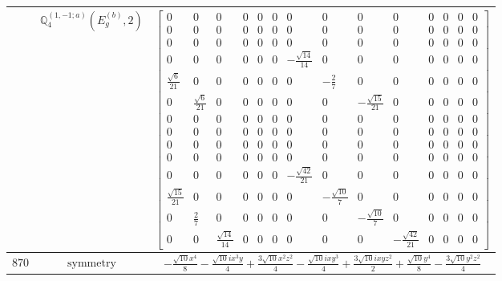 \documentclass[fleqn,8pt,landscape]{jsarticle}
\begin{document}
\begin{longtable}{ccc}
$  $ & $ \mathbb{Q}_{4}^{(1,-1;a)}(E_{g}^{(b)},2) $ & $ \begin{bmatrix} 0 & 0 & 0 & 0 & 0 & 0 & 0 & 0 & 0 & 0 & 0 & 0 & 0 & 0 \\ 0 & 0 & 0 & 0 & 0 & 0 & 0 & 0 & 0 & 0 & 0 & 0 & 0 & 0 \\ 0 & 0 & 0 & 0 & 0 & 0 & 0 & 0 & 0 & 0 & 0 & 0 & 0 & 0 \\ 0 & 0 & 0 & 0 & 0 & 0 & - \frac{\sqrt{14}}{14} & 0 & 0 & 0 & 0 & 0 & 0 & 0 \\ \frac{\sqrt{6}}{21} & 0 & 0 & 0 & 0 & 0 & 0 & - \frac{2}{7} & 0 & 0 & 0 & 0 & 0 & 0 \\ 0 & \frac{\sqrt{6}}{21} & 0 & 0 & 0 & 0 & 0 & 0 & - \frac{\sqrt{15}}{21} & 0 & 0 & 0 & 0 & 0 \\ 0 & 0 & 0 & 0 & 0 & 0 & 0 & 0 & 0 & 0 & 0 & 0 & 0 & 0 \\ 0 & 0 & 0 & 0 & 0 & 0 & 0 & 0 & 0 & 0 & 0 & 0 & 0 & 0 \\ 0 & 0 & 0 & 0 & 0 & 0 & 0 & 0 & 0 & 0 & 0 & 0 & 0 & 0 \\ 0 & 0 & 0 & 0 & 0 & 0 & 0 & 0 & 0 & 0 & 0 & 0 & 0 & 0 \\ 0 & 0 & 0 & 0 & 0 & 0 & - \frac{\sqrt{42}}{21} & 0 & 0 & 0 & 0 & 0 & 0 & 0 \\ \frac{\sqrt{15}}{21} & 0 & 0 & 0 & 0 & 0 & 0 & - \frac{\sqrt{10}}{7} & 0 & 0 & 0 & 0 & 0 & 0 \\ 0 & \frac{2}{7} & 0 & 0 & 0 & 0 & 0 & 0 & - \frac{\sqrt{10}}{7} & 0 & 0 & 0 & 0 & 0 \\ 0 & 0 & \frac{\sqrt{14}}{14} & 0 & 0 & 0 & 0 & 0 & 0 & - \frac{\sqrt{42}}{21} & 0 & 0 & 0 & 0 \end{bmatrix} $ \\ \hline
$ 870 $ & $ \text{symmetry} $ & $ - \frac{\sqrt{10} x^{4}}{8} - \frac{\sqrt{10} i x^{3} y}{4} + \frac{3 \sqrt{10} x^{2} z^{2}}{4} - \frac{\sqrt{10} i x y^{3}}{4} + \frac{3 \sqrt{10} i x y z^{2}}{2} + \frac{\sqrt{10} y^{4}}{8} - \frac{3 \sqrt{10} y^{2} z^{2}}{4} $ \\

\end{longtable}
\end{document}
